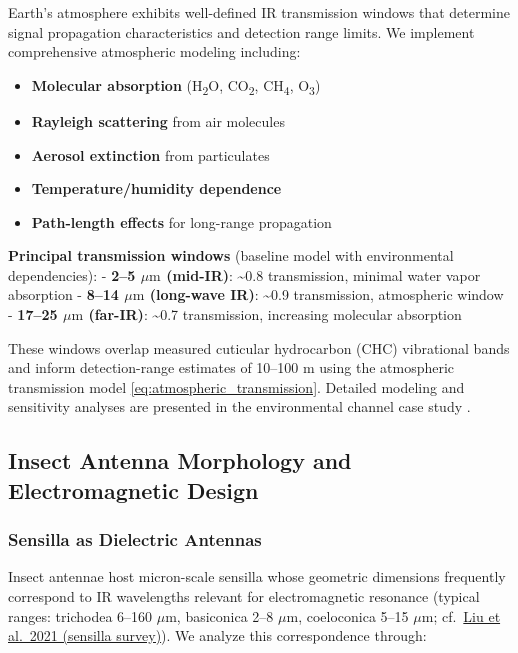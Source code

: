 \documentclass[
  13pt,
  a4paperpaper,
  12pt]{article}
\providecommand{\tightlist}{%
  \setlength{\itemsep}{0pt}\setlength{\parskip}{0pt}}
\begin{document}
Earth's atmosphere exhibits well-defined IR transmission windows that
determine signal propagation characteristics and detection range limits.
We implement comprehensive atmospheric modeling including:

\begin{itemize}
\tightlist
\item
  \textbf{Molecular absorption} (H\textsubscript{2}O,
  CO\textsubscript{2}, CH\textsubscript{4}, O\textsubscript{3})
\item
  \textbf{Rayleigh scattering} from air molecules
\item
  \textbf{Aerosol extinction} from particulates
\item
  \textbf{Temperature/humidity dependence}
\item
  \textbf{Path-length effects} for long-range propagation
\end{itemize}

\textbf{Principal transmission windows} (baseline model with
environmental dependencies): - \textbf{2--5 \(\mu\mathrm{m}\) (mid-IR)}:
\textasciitilde0.8 transmission, minimal water vapor absorption -
\textbf{8--14 \(\mu\mathrm{m}\) (long-wave IR)}: \textasciitilde0.9
transmission, atmospheric window - \textbf{17--25 \(\mu\mathrm{m}\)
(far-IR)}: \textasciitilde0.7 transmission, increasing molecular
absorption

These windows overlap measured cuticular hydrocarbon (CHC) vibrational
bands and inform detection-range estimates of 10--100 m using the
atmospheric transmission model \eqref{eq:atmospheric_transmission}.
Detailed modeling and sensitivity analyses are presented in the
environmental channel case study .

\subsection{Insect Antenna Morphology and Electromagnetic
Design}\label{insect-antenna-morphology-and-electromagnetic-design}

\subsubsection{Sensilla as Dielectric
Antennas}\label{sensilla-as-dielectric-antennas}

Insect antennae host micron-scale sensilla whose geometric dimensions
frequently correspond to IR wavelengths relevant for electromagnetic
resonance (typical ranges: trichodea 6--160 \(\mu\mathrm{m}\),
basiconica 2--8 \(\mu\mathrm{m}\), coeloconica 5--15 \(\mu\mathrm{m}\);
cf.~\href{https://pmc.ncbi.nlm.nih.gov/articles/PMC7831480/}{Liu et
al.~2021 (sensilla survey)}). We analyze this correspondence through:
\end{document}
